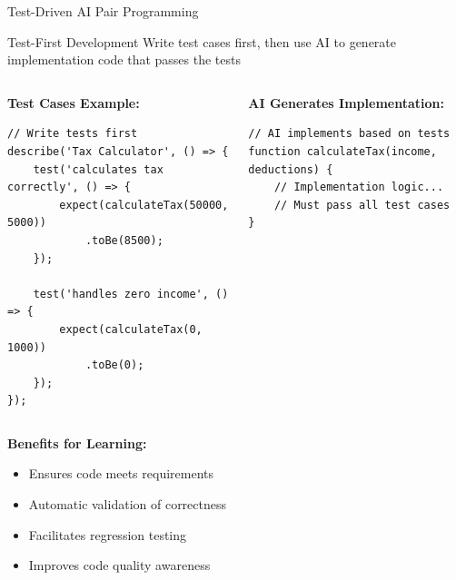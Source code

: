 \documentclass{beamer}
\begin{document}
\begin{frame}[t,fragile]{Test-Driven AI Pair Programming}
    \begin{block}{Test-First Development}
        Write test cases first, then use AI to generate implementation code that passes the tests
    \end{block}
    
    \begin{columns}
        \begin{column}{0.5\textwidth}
            \textbf{Test Cases Example:}
            \begin{lstlisting}[style=code]
// Write tests first
describe('Tax Calculator', () => {
    test('calculates tax correctly', () => {
        expect(calculateTax(50000, 5000))
            .toBe(8500);
    });
    
    test('handles zero income', () => {
        expect(calculateTax(0, 1000))
            .toBe(0);
    });
});
            \end{lstlisting}
        \end{column}
        \begin{column}{0.5\textwidth}
            \textbf{AI Generates Implementation:}
            \begin{lstlisting}[style=code]
// AI implements based on tests
function calculateTax(income, deductions) {
    // Implementation logic...
    // Must pass all test cases
}
            \end{lstlisting}
        \end{column}
    \end{columns}
    
    \textbf{Benefits for Learning:}
    \begin{itemize}
        \item Ensures code meets requirements
        \item Automatic validation of correctness
        \item Facilitates regression testing
        \item Improves code quality awareness
    \end{itemize}
\end{frame}
\end{document}
